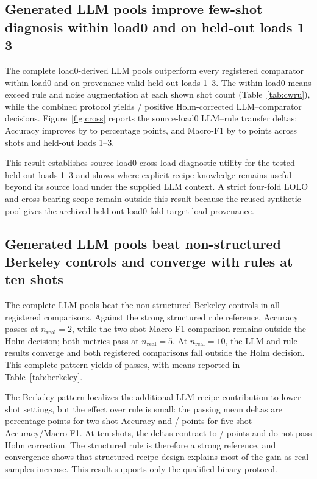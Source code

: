 \documentclass[a4paper,fleqn]{cas-sc}
\begin{document}
\subsection{Generated LLM pools improve few-shot diagnosis within load0 and on
held-out loads 1--3}

The complete load0-derived LLM pools outperform every registered comparator
within load0 and on provenance-valid held-out loads 1--3. The within-load0
means exceed rule and noise augmentation at each shown shot count
(Table~\ref{tab:cwru}), while the combined protocol yields
\BreezeCWRUPassedTests/\BreezeCWRURegisteredTests{} positive Holm-corrected
LLM--comparator decisions. Figure~\ref{fig:cross} reports the source-load0
LLM--rule transfer deltas: Accuracy improves by \BreezeCWRUAccDeltaMin{} to
\BreezeCWRUAccDeltaMax{} percentage points, and Macro-F1 by
\BreezeCWRUFOneDeltaMin{} to \BreezeCWRUFOneDeltaMax{} points across shots and
held-out loads 1--3.



This result establishes source-load0 cross-load diagnostic utility for the
tested held-out loads 1--3 and shows where explicit recipe knowledge remains
useful beyond its source load under the supplied LLM context. A strict
four-fold LOLO and cross-bearing scope
remain outside this result because the reused synthetic pool gives the archived
held-out-load0 fold target-load provenance.

\subsection{Generated LLM pools beat non-structured Berkeley controls and
converge with rules at ten shots}

The complete LLM pools beat the non-structured Berkeley controls in all
\BreezeBerkeleyUnstructuredPassedTests{} registered comparisons. Against the
strong structured rule reference, Accuracy passes at
$n_{\mathrm{real}}=2$, while the two-shot Macro-F1 comparison remains outside
the Holm decision; both metrics pass at $n_{\mathrm{real}}=5$. At
$n_{\mathrm{real}}=10$, the LLM and rule results converge and both registered
comparisons fall outside the Holm decision. This complete pattern yields
\BreezeBerkeleyPassedTests{} of \BreezeBerkeleyRegisteredTests{} passes, with
means reported in Table~\ref{tab:berkeley}.



The Berkeley pattern localizes the additional LLM recipe contribution to
lower-shot settings, but the effect over rule is small: the passing mean
deltas are \BreezeBerkeleyNTwoAccRuleDelta{} percentage points for two-shot
Accuracy and \BreezeBerkeleyNFiveAccRuleDelta{}/%
\BreezeBerkeleyNFiveFOneRuleDelta{} points for five-shot
Accuracy/Macro-F1. At ten shots, the deltas contract to
\BreezeBerkeleyNTenAccRuleDelta{}/\BreezeBerkeleyNTenFOneRuleDelta{} points
and do not pass Holm correction. The structured rule is
therefore a strong reference, and convergence shows that structured recipe
design explains most of the gain as real samples increase. This result
supports only the qualified binary protocol.
\end{document}
